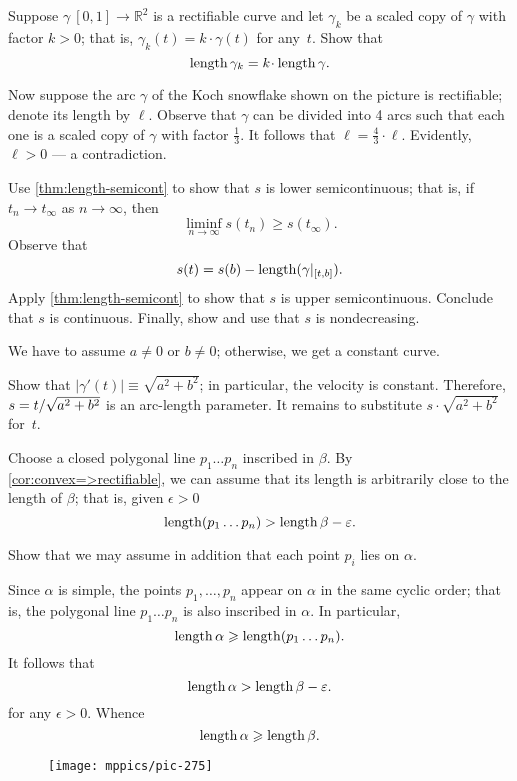 \begin{multicols}{2}
Suppose $\gamma\:[0,1]\to\mathbb{R}^2$ is a rectifiable curve and let $\gamma_k$ be a scaled copy of $\gamma$ with factor $k>0$;
that is, $\gamma_k(t)=k\cdot\gamma(t)$ for any~$t$.
Show that 
\[\length\gamma_k=k\cdot\length \gamma.\]

Now suppose the arc $\gamma$ of the Koch snowflake shown on the picture is rectifiable; denote its length by $\ell$.
Observe that $\gamma$ can be divided into 4 arcs such that each one is a scaled copy of $\gamma$ with factor $\tfrac13$.
It follows that $\ell=\tfrac43\cdot\ell$.
Evidently, $\ell>0$ --- a contradiction.

Use \ref{thm:length-semicont} to show that $s$ is lower semicontinuous;
that is, if $t_n\to t_\infty$ as $n\to\infty$, then 
\[\liminf_{n\to\infty} s(t_n)\ge s(t_\infty).\]
Observe that
\[s(t)=s(b)-\mathop{\rm length}\nolimits(\gamma|_{[t,b]}).\]
Apply \ref{thm:length-semicont} to show that $s$ is upper semicontinuous.
Conclude that $s$ is continuous.
Finally, show and use that $s$ is nondecreasing.

We have to assume $a\ne 0$ or $b\ne0$;
otherwise, we get a constant curve.

Show that $|\gamma'(t)|\equiv \sqrt{a^2+b^2}$;
in particular, the velocity is constant.
Therefore, $s\z=t/\sqrt{a^2+b^2}$ is an arc-length parameter.
It remains to substitute $s\cdot \sqrt{a^2+b^2}$ for~$t$.




Choose a closed polygonal line $p_1\dots p_n$ inscribed in $\beta$.
By \ref{cor:convex=>rectifiable}, we can assume that its length is arbitrarily close to the length of $\beta$;
that is, given $\epsilon>0$ 
\[\mathop{\rm length}\nolimits (p_1\dots p_n)>\mathop{\rm length}\nolimits\beta-\varepsilon.\]

Show that we may assume in addition that each point $p_i$ lies on $\alpha$.

Since $\alpha$ is simple, the points $p_1,\dots,p_n$ appear on $\alpha$ in the same cyclic order;
that is, the polygonal line $p_1\dots p_n$ is also inscribed in $\alpha$.
In particular,
\[\mathop{\rm length}\nolimits\alpha\geqslant \mathop{\rm length}\nolimits (p_1\dots p_n).\]
It follows that 
\[\mathop{\rm length}\nolimits\alpha>\mathop{\rm length}\nolimits\beta-\varepsilon.\]
for any $\epsilon>0$.
Whence 
\[\mathop{\rm length}\nolimits\alpha\geqslant\mathop{\rm length}\nolimits\beta.\]

\begin{wrapfigure}{r}{25 mm}
\vskip-6mm
\centering
\texttt{[image: mppics/pic-275]}
\vskip0mm
\end{wrapfigure}


\end{multicols}
